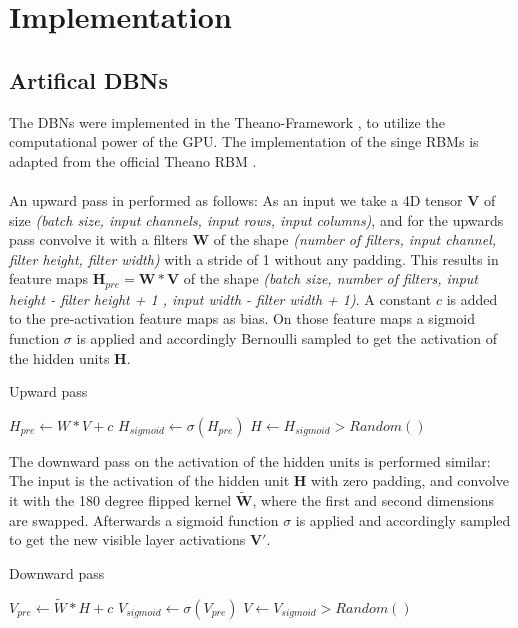 \chapter{Implementation} \label{c:impl}


\section{Artifical DBNs} \label{c:dbnimpl}

The DBNs were implemented in the Theano-Framework \cite{2016arXiv160502688full}, to utilize the computational power of the GPU.
The implementation of the singe RBMs is adapted from the official Theano RBM \cite{theanoRBM}.
\\
\\
An upward pass in performed as follows:
As an input we take a 4D tensor $\textbf{V}$ of size \textit{(batch size, input channels, input rows, input columns)}, and for the upwards pass convolve it with a filters $\textbf{W}$ of the shape \textit{(number of filters, input channel, filter height, filter width)} with a stride of 1 without any padding.
This results in feature maps $\textbf{H}_{pre} = \textbf{W} * \textbf{V}$ of the shape \textit{(batch size, number of filters, input height - filter height + 1 , input width - filter width + 1)}.
A constant $c$ is added to the pre-activation feature maps as bias.
On those feature maps a sigmoid function $\sigma$ is applied and accordingly Bernoulli sampled to get the activation of the hidden units $\textbf{H}$.

\begin{algorithm}
\caption{Upward pass}
\begin{algorithmic}
\State ${H}_{pre}\gets W * V + c $  
\State ${H}_{sigmoid} \gets \sigma({H}_{pre})$
\State $H \gets {H}_{sigmoid} > Random()$
\end{algorithmic}
\end{algorithm}


The downward pass on the activation of the hidden units is performed similar:
The input is the activation of the hidden unit $\textbf{H}$ with zero padding, and convolve it with the 180 degree flipped kernel $\tilde{\textbf{W}}$, where the first and second dimensions are swapped.
Afterwards a sigmoid function $\sigma$ is applied and accordingly sampled to get the new visible layer activations $\textbf{V}'$.

\begin{algorithm}
\caption{Downward pass}
\begin{algorithmic}
\State ${V}_{pre}\gets \tilde{W} * H + c $  
\State ${V}_{sigmoid} \gets \sigma({V}_{pre})$
\State $V \gets {V}_{sigmoid} > Random()$
\end{algorithmic}
\end{algorithm}

